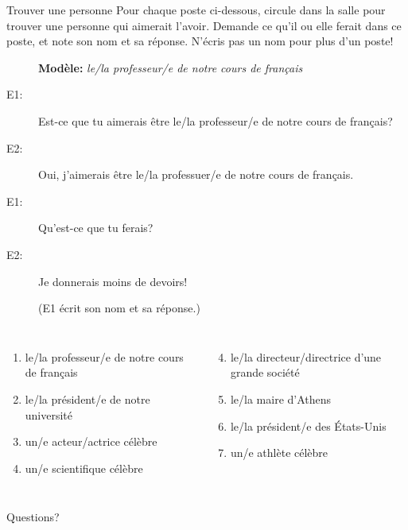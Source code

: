 \documentclass{beamer}
\begin{document}
  \begin{frame}{Trouver une personne}
    \scriptsize
    Pour chaque poste ci-dessous, circule dans la salle pour trouver une personne qui aimerait l'avoir.
    Demande ce qu'il ou elle ferait dans ce poste, et note son nom et sa réponse.
    N'écris pas un nom pour plus d'un poste!
    \begin{description}
      \item[] \textbf{Modèle:} \emph{le/la professeur/e de notre cours de français}
      \item[E1:] Est-ce que tu aimerais être le/la professeur/e de notre cours de français?
      \item[E2:] Oui, j'aimerais être le/la professuer/e de notre cours de français.
      \item[E1:] Qu'est-ce que tu ferais?
      \item[E2:] Je donnerais moins de devoirs!
      \item[] (E1 écrit son nom et sa réponse.)
    \end{description}
    \begin{columns}[t]
        \begin{enumerate}
          \item le/la professeur/e de notre cours de français
          \item le/la président/e de notre université
          \item un/e acteur/actrice célèbre
          \item un/e scientifique célèbre
        \end{enumerate}
        \begin{enumerate}
          \setcounter{enumi}{3}
          \item le/la directeur/directrice d'une grande société
          \item le/la maire d'Athens
          \item le/la président/e des États-Unis
          \item un/e athlète célèbre
        \end{enumerate}
    \end{columns}
  \end{frame}

  \begin{frame}{}
    \begin{center}
      \Large Questions?
    \end{center}
  \end{frame}
\end{document}
